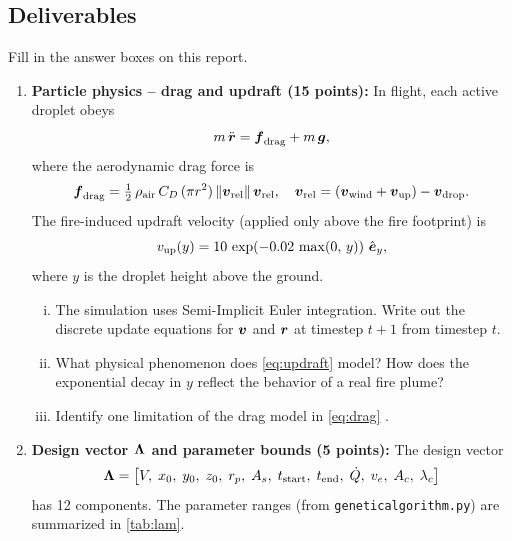 \documentclass{article}
\begin{document}
\subsection*{Deliverables}
Fill in the answer boxes on this report. 
\begin{enumerate}


\item[1.] \textbf{Particle physics -- drag and updraft (15 points):}
In flight, each active droplet obeys
\begin{equation}
    m\,\ddot{\mbox{\boldmath $r$}} = \mbox{\boldmath $f$}_\text{drag} + m\,\mbox{\boldmath $g$},
    \label{eq:eom}
\end{equation}
where the aerodynamic drag force is
\begin{equation}
    \mbox{\boldmath $f$}_\text{drag} = \tfrac{1}{2}\,\rho_\text{air}\,C_D\,(\pi r^2)\,\|\mbox{\boldmath $v$}_\text{rel}\|\,\mbox{\boldmath $v$}_\text{rel},
    \quad \mbox{\boldmath $v$}_\text{rel} = (\mbox{\boldmath $v$}_\text{wind} + \mbox{\boldmath $v$}_\text{up}) - \mbox{\boldmath $v$}_\text{drop}.
    \label{eq:drag}
\end{equation}
The fire-induced updraft velocity (applied only above the fire footprint) is
\begin{equation}
    v_\text{up}(y) = 10\,\exp\!\left(-0.02\,\max(0,\,y)\right)\,\hat{\mbox{\boldmath $e$}}_y,
    \label{eq:updraft}
\end{equation}
where $y$ is the droplet height above the ground.

\begin{enumerate}[(i)]
    \item The simulation uses Semi-Implicit Euler integration. Write out the discrete update equations for $\mbox{\boldmath $v$}$ and $\mbox{\boldmath $r$}$ at timestep $t+1$ from timestep $t$.
    \item What physical phenomenon does \cref{eq:updraft} model? How does the exponential decay in $y$ reflect the behavior of a real fire plume?
    \item Identify one limitation of the drag model in \cref{eq:drag} .
\end{enumerate}

\begin{answer}
\end{answer}



\item[2. (a)] \textbf{Design vector $\mbox{\boldmath $\Lambda$}$ and parameter bounds (5 points):}
The design vector
\begin{equation}
    \mbox{\boldmath $\Lambda$} = \bigl[V,\; x_0,\; y_0,\; z_0,\; r_p,\; A_s,\; t_\text{start},\; t_\text{end},\; \dot{Q},\; v_e,\; A_c,\; \lambda_c\bigr]
    \label{eq:lam}
\end{equation}
has 12 components.
The parameter ranges (from \texttt{geneticalgorithm.py}) are summarized in \cref{tab:lam}.


\end{enumerate}
\end{document}
